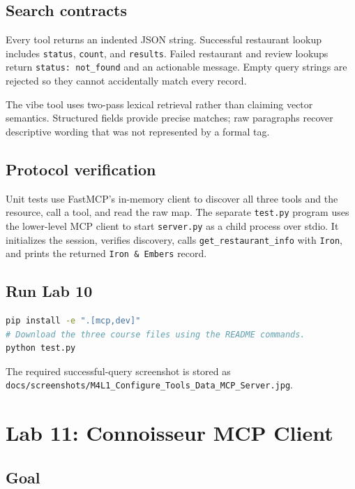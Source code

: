 \documentclass[11pt]{article}
\begin{document}
\subsection{Search contracts}

Every tool returns an indented JSON string. Successful restaurant lookup
includes \texttt{status}, \texttt{count}, and \texttt{results}. Failed
restaurant and review lookups return \texttt{status: not\_found} and an
actionable message. Empty query strings are rejected so they cannot accidentally
match every record.

The vibe tool uses two-pass lexical retrieval rather than claiming vector
semantics. Structured fields provide precise matches; raw paragraphs recover
descriptive wording that was not represented by a formal tag.

\subsection{Protocol verification}

Unit tests use FastMCP's in-memory client to discover all three tools and the
resource, call a tool, and read the raw map. The separate \texttt{test.py}
program uses the lower-level MCP client to start \texttt{server.py} as a child
process over stdio. It initializes the session, verifies discovery, calls
\texttt{get\_restaurant\_info} with \texttt{Iron}, and prints the returned
\texttt{Iron \& Embers} record.

\subsection{Run Lab 10}

\begin{lstlisting}[language=bash]
pip install -e ".[mcp,dev]"
# Download the three course files using the README commands.
python test.py
\end{lstlisting}

The required successful-query screenshot is stored as
\texttt{docs/screenshots/M4L1\_Configure\_Tools\_Data\_MCP\_Server.jpg}.

\section{Lab 11: Connoisseur MCP Client}

\subsection{Goal}
\end{document}
